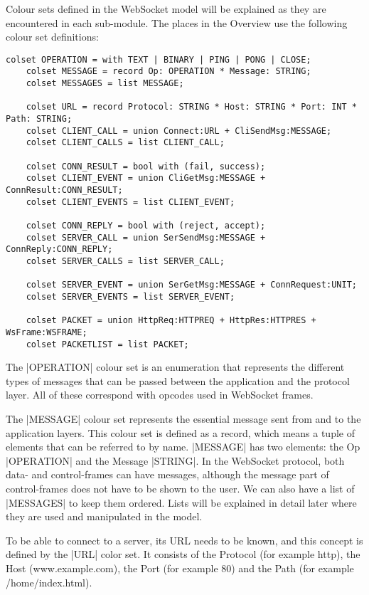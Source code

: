 	Colour sets defined in the WebSocket model will be explained as they are
	encountered in each sub-module. The places in the Overview use the following
	colour set definitions:
	
	\begin{lstlisting}[label=lst:overview_colset,caption=Overview colour
	sets,gobble=1,float=tbh] 
	colset OPERATION = with TEXT | BINARY | PING | PONG | CLOSE; 
	colset MESSAGE = record Op: OPERATION *	Message: STRING;
	colset MESSAGES = list MESSAGE;
	
	colset URL = record Protocol: STRING * Host: STRING * Port: INT * Path: STRING;
	colset CLIENT_CALL = union Connect:URL + CliSendMsg:MESSAGE;
	colset CLIENT_CALLS = list CLIENT_CALL;
	
	colset CONN_RESULT = bool with (fail, success);
	colset CLIENT_EVENT = union CliGetMsg:MESSAGE + ConnResult:CONN_RESULT;
	colset CLIENT_EVENTS = list CLIENT_EVENT;
	
	colset CONN_REPLY = bool with (reject, accept);
	colset SERVER_CALL = union SerSendMsg:MESSAGE + ConnReply:CONN_REPLY;
	colset SERVER_CALLS = list SERVER_CALL;
	
	colset SERVER_EVENT = union SerGetMsg:MESSAGE + ConnRequest:UNIT;
	colset SERVER_EVENTS = list SERVER_EVENT;
	
	colset PACKET = union HttpReq:HTTPREQ + HttpRes:HTTPRES + WsFrame:WSFRAME;
	colset PACKETLIST = list PACKET;
	\end{lstlisting}
	
	The |OPERATION| colour set is an enumeration that represents the
	different types of messages that can be passed between the application and the
	protocol layer. All of these correspond with opcodes used in WebSocket frames.
	
	The |MESSAGE| colour set represents the essential message sent from and to the
	application layers. This colour set is defined as a record, which means a tuple
	of elements that can be referred to by name. |MESSAGE| has two elements: the Op
	|OPERATION| and the Message |STRING|. In the WebSocket protocol, both data- and
	control-frames can have messages, although the message part of control-frames
	does not have to be shown to the user. We can also have a list of |MESSAGES| to
	keep them ordered. Lists will be explained in detail later where they are used and
	manipulated in the model.
	
	To be able to connect to a server, its URL needs to be known, and this concept
	is defined by the |URL| color set. It consists of the Protocol (for
	example http), the Host (www.example.com), the Port (for example 80) and the
	Path (for example /home/index.html).
	
